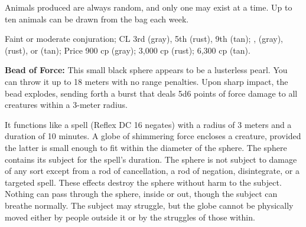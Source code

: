 Animals produced are always random, and only one may exist at a time. Up to ten animals can be drawn from the bag each week.

Faint or moderate conjuration; CL 3rd (gray), 5th (rust), 9th (tan); ,  (gray),  (rust), or  (tan); Price 900 cp (gray); 3,000 cp (rust); 6,300 cp (tan).




\textbf{Bead of Force:} This small black sphere appears to be a lusterless pearl. You can throw it up to 18 meters with no range penalties. Upon sharp impact, the bead explodes, sending forth a burst that deals 5d6 points of force damage to all creatures within a 3-meter radius.

It functions like a  spell (Reflex DC 16 negates) with a radius of 3 meters and a duration of 10 minutes. A globe of shimmering force encloses a creature, provided the latter is small enough to fit within the diameter of the sphere. The sphere contains its subject for the spell's duration. The sphere is not subject to damage of any sort except from a rod of cancellation, a rod of negation, disintegrate, or a targeted  spell. These effects destroy the sphere without harm to the subject. Nothing can pass through the sphere, inside or out, though the subject can breathe normally. The subject may struggle, but the globe cannot be physically moved either by people outside it or by the struggles of those within.

